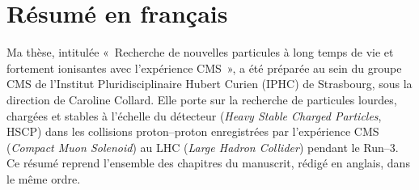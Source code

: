 \makeatletter
{}
\makeatother

\begingroup
\resumeLangueDebut
\renewcommand{\tablename}{Tableau}

\chapter*{Résumé en français}
\label{ch:resume}

\setcounter{section}{0}
\renewcommand{\thesection}{\Roman{section}}
\renewcommand{\thesubsection}{\thesection.\arabic{subsection}}
\setcounter{figure}{0}\setcounter{table}{0}\setcounter{equation}{0}
\renewcommand{\thefigure}{\thesection.\arabic{figure}}
\renewcommand{\thetable}{\thesection.\arabic{table}}
\renewcommand{\theequation}{\thesection.\arabic{equation}}
\renewcommand{\theHsection}{resume.\Roman{section}}
\renewcommand{\theHfigure}{resume.\Roman{section}.\arabic{figure}}
\renewcommand{\theHtable}{resume.\Roman{section}.\arabic{table}}
\renewcommand{\theHequation}{resume.\Roman{section}.\arabic{equation}}

Ma thèse, intitulée «~Recherche de nouvelles particules à long temps de vie et fortement ionisantes avec l'expérience CMS~», a été préparée au sein du groupe CMS de l'Institut Pluridisciplinaire Hubert Curien (IPHC) de Strasbourg, sous la direction de Caroline Collard. Elle porte sur la recherche de particules lourdes, chargées et stables à l'échelle du détecteur (\textit{Heavy Stable Charged Particles}, HSCP) dans les collisions proton--proton enregistrées par l'expérience CMS (\textit{Compact Muon Solenoid}) au LHC (\textit{Large Hadron Collider}) pendant le Run--3. Ce résumé reprend l'ensemble des chapitres du manuscrit, rédigé en anglais, dans le même ordre.


